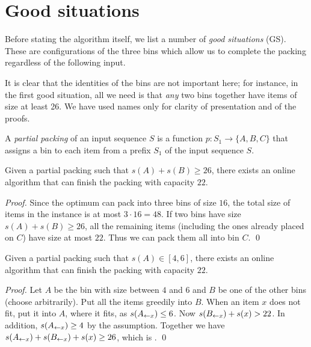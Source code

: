 \section{Good situations}\label{sec:3:gs}
Before stating the algorithm itself, we list a number of \textit{good
situations} (GS). These are configurations of the three bins which
allow us to complete the packing regardless of the following input.

It is clear that the identities of the bins are not important here;
for instance, in the first good situation, all we need is that
\emph{any} two bins together have items of size at least 26. We have
used names only for clarity of presentation and of the proofs.

\begin{dfn}
A \textit{partial packing} of an input sequence $S$
is a function $p: S_1 \to \{A,B,C\}$ that assigns a bin to each
item from a prefix $S_1$ of the input sequence $S$.
\end{dfn}


\begin{goodsit}\label{lem:gs1}
Given a partial packing such that $s(A) + s(B) \geq 26$, 
there exists an online algorithm that can finish
the packing with capacity $22$.
\end{goodsit}

\begin{proof}
Since the optimum can pack into three bins of size $16$, the total
size of items in the instance is at most $3\cdot 16=48$. If two bins
have size $s(A) + s(B) \geq 26$, all the remaining items (including
the ones already placed on $C$) have size at most $22$.  Thus we can
pack them all into bin $C$.
\qed
\end{proof}

\begin{goodsit}\label{lem:gs2}
Given a partial packing such that $s(A) \in [4, 6]$, 
there exists an online algorithm that can finish
the packing with capacity $22$.
\end{goodsit}

\begin{proof}
Let $A$ be the bin with size between $4$ and $6$ and $B$ be one of the
other bins (choose arbitrarily). Put all the items greedily into
$B$. When an item $x$ does not fit, put it into $A$, where it fits, as
 $s(A_{\leftarrow x})\le 6$. Now $s(B_{\leftarrow x})+s(x)>22$. In addition, $s(A_{\leftarrow x})\ge 4$ by the assumption.  Together we
have $s(A_{\leftarrow x}) + s(B_{\leftarrow x})+s(x) \geq 26$, which is .
\qed
\end{proof}

